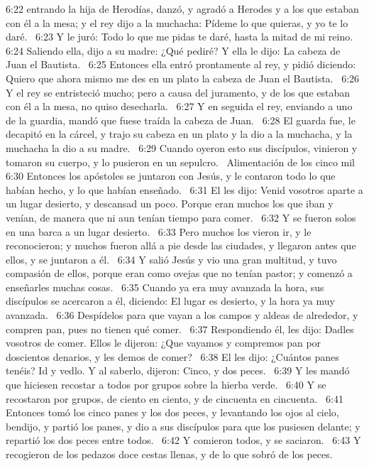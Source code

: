 6:22 entrando la hija de Herodías, danzó, y agradó a Herodes y a los que estaban con él a la mesa; y el rey dijo a la muchacha: Pídeme lo que quieras, y yo te lo daré.  
6:23 Y le juró: Todo lo que me pidas te daré, hasta la mitad de mi reino.  
6:24 Saliendo ella, dijo a su madre: ¿Qué pediré? Y ella le dijo: La cabeza de Juan el Bautista.  
6:25 Entonces ella entró prontamente al rey, y pidió diciendo: Quiero que ahora mismo me des en un plato la cabeza de Juan el Bautista.  
6:26 Y el rey se entristeció mucho; pero a causa del juramento, y de los que estaban con él a la mesa, no quiso desecharla.  
6:27 Y en seguida el rey, enviando a uno de la guardia, mandó que fuese traída la cabeza de Juan.  
6:28 El guarda fue, le decapitó en la cárcel, y trajo su cabeza en un plato y la dio a la muchacha, y la muchacha la dio a su madre.  
6:29 Cuando oyeron esto sus discípulos, vinieron y tomaron su cuerpo, y lo pusieron en un sepulcro.  
Alimentación de los cinco mil   
6:30 Entonces los apóstoles se juntaron con Jesús, y le contaron todo lo que habían hecho, y lo que habían enseñado.  
6:31 El les dijo: Venid vosotros aparte a un lugar desierto, y descansad un poco. Porque eran muchos los que iban y venían, de manera que ni aun tenían tiempo para comer.  
6:32 Y se fueron solos en una barca a un lugar desierto.  
6:33 Pero muchos los vieron ir, y le reconocieron; y muchos fueron allá a pie desde las ciudades, y llegaron antes que ellos, y se juntaron a él.  
6:34 Y salió Jesús y vio una gran multitud, y tuvo compasión de ellos, porque eran como ovejas que no tenían pastor; y comenzó a enseñarles muchas cosas.  
6:35 Cuando ya era muy avanzada la hora, sus discípulos se acercaron a él, diciendo: El lugar es desierto, y la hora ya muy avanzada.  
6:36 Despídelos para que vayan a los campos y aldeas de alrededor, y compren pan, pues no tienen qué comer.  
6:37 Respondiendo él, les dijo: Dadles vosotros de comer. Ellos le dijeron: ¿Que vayamos y compremos pan por doscientos denarios, y les demos de comer?  
6:38 El les dijo: ¿Cuántos panes tenéis? Id y vedlo. Y al saberlo, dijeron: Cinco, y dos peces.  
6:39 Y les mandó que hiciesen recostar a todos por grupos sobre la hierba verde.  
6:40 Y se recostaron por grupos, de ciento en ciento, y de cincuenta en cincuenta.  
6:41 Entonces tomó los cinco panes y los dos peces, y levantando los ojos al cielo, bendijo, y partió los panes, y dio a sus discípulos para que los pusiesen delante; y repartió los dos peces entre todos.  
6:42 Y comieron todos, y se saciaron.  
6:43 Y recogieron de los pedazos doce cestas llenas, y de lo que sobró de los peces.  
